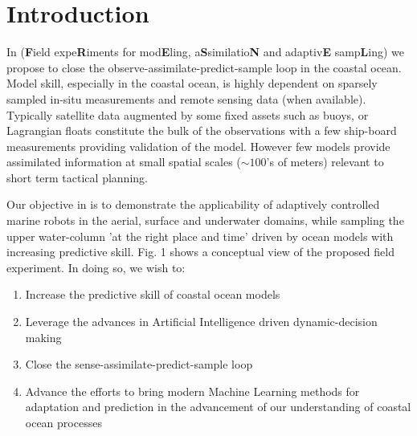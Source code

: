 \section{Introduction}





In \proj (\textbf{F}ield expe\textbf{R}iments for mod\textbf{E}ling,
a\textbf{S}similatio\textbf{N} and adaptiv\textbf{E}
samp\textbf{L}ing) we propose to close the
observe-assimilate-predict-sample loop in the coastal ocean. Model
skill, especially in the coastal ocean, is highly dependent on
sparsely sampled in-situ measurements and remote sensing data (when
available). Typically satellite data augmented by some fixed assets
such as buoys, or Lagrangian floats constitute the bulk of the
observations with a few ship-board measurements providing validation
of the model. However few models provide assimilated information at
small spatial scales ($\sim 100$'s of meters) relevant to short term
tactical planning.

Our objective in \proj is to demonstrate the applicability of adaptively
controlled marine robots in the aerial, surface and underwater domains,
while sampling the upper water-column 'at the right place and time'
driven by ocean models with increasing predictive skill. Fig. 1 shows a
conceptual view of the proposed field experiment. In doing so, we wish
to:

\begin{enumerate}

\item Increase the predictive skill of coastal ocean models

\item Leverage the advances in Artificial Intelligence driven
  dynamic-decision making

\item Close the sense-assimilate-predict-sample loop
  
\item Advance the efforts to bring modern Machine Learning methods for
  adaptation and prediction in the advancement of our understanding of
  coastal ocean processes
  
\end{enumerate}


